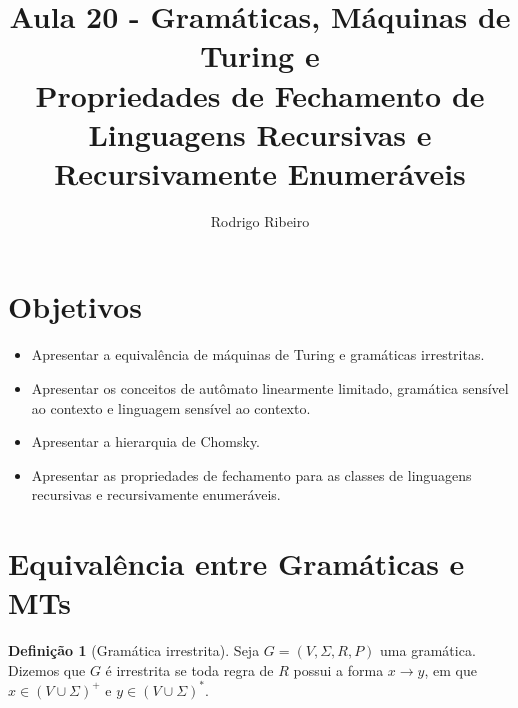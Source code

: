 \documentclass[a4paper]{article}
\theoremstyle{definition}
\newtheorem{Definition}{Definição}
\begin{document}
\title{Aula 20 - Gramáticas, Máquinas de Turing e\\ Propriedades de Fechamento
  de Linguagens Recursivas e Recursivamente Enumeráveis}
  \author{Rodrigo Ribeiro}

  \maketitle

  

  \pagestyle{fancy}


  \section*{Objetivos}

  \begin{itemize}
     \item Apresentar a equivalência de máquinas de Turing e gramáticas
       irrestritas.
     \item Apresentar os conceitos de autômato linearmente limitado,
       gramática sensível ao contexto e linguagem sensível ao contexto.
     \item Apresentar a hierarquia de Chomsky.
     \item Apresentar as propriedades de fechamento para as classes de
           linguagens recursivas e recursivamente enumeráveis.
  \end{itemize}

  \section{Equivalência entre Gramáticas e MTs}


  \begin{Definition}[Gramática irrestrita]
    Seja $G = (V,\Sigma, R, P)$ uma gramática. Dizemos que $G$ é irrestrita
    se toda regra de $R$ possui a forma $x \to y$, em que $x \in (V\cup
    \Sigma)^+$ e $y \in (V\cup \Sigma)^*$.
  \end{Definition}
\end{document}
